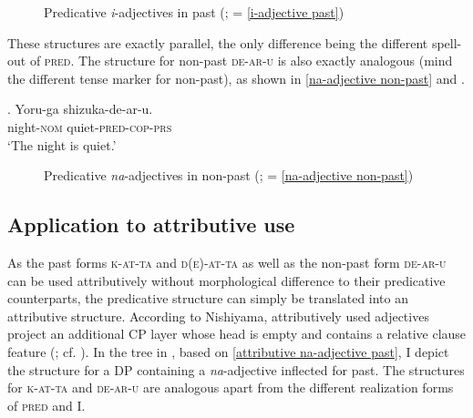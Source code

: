 \begin{figure}
\centering
{}
\caption{Predicative \textit{i}-adjectives in past (\citealt[190, 192]{nishiyama:1999:adj}; = \ref{i-adjective past})}
\label{i-adjective past tree}
\end{figure}

\newpage
These structures are exactly parallel, the only difference being the different spell-out of \textsc{pred}. The structure for non-past \textsc{de-ar-u} is also exactly analogous (mind the different tense marker for non-past), as shown in \ref{na-adjective non-past} and .

\exg. Yoru-ga shizuka-de-ar-u.\\
night-\textsc{nom} quiet-\textsc{pred-cop-prs}\\
`The night is quiet.' \label{na-adjective non-past}

\begin{figure}
\centering
{}
\caption{Predicative \textit{na}-adjectives in non-past (\citealt[189, 194]{nishiyama:1999:adj}; = \ref{na-adjective non-past})}
\label{na-adjective non-past tree}
\end{figure}

\subsection{Application to attributive use}

As the past forms \textsc{k-at-ta} and \textsc{d(e)-at-ta} as well as the non-past form \textsc{de-ar-u} can be used attributively without morphological difference to their predicative counterparts, the predicative structure can simply be translated into an attributive structure. According to Nishiyama, attributively used adjectives project an additional CP layer whose head is empty and contains a relative clause feature (\citealt[197]{nishiyama:1999:adj}; cf. \citealt{kaplan:1995:the}). In the tree in , based on \ref{attributive na-adjective past}, I depict the structure for a DP containing a \textit{na}-adjective inflected for past. The structures for \textsc{k-at-ta} and \textsc{de-ar-u} are analogous apart from the different realization forms of \textsc{pred} and I.

